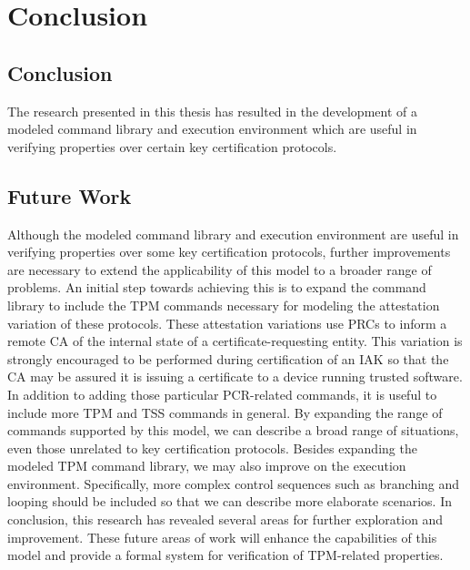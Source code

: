 \chapter{Conclusion}



\section{Conclusion}

The research presented in this thesis has resulted in the development of a modeled command library and execution environment which are useful in verifying properties over certain key certification protocols.


\section{Future Work}

Although the modeled command library and execution environment are useful in verifying properties over some key certification protocols, further improvements are necessary to extend the applicability of this model to a broader range of problems. An initial step towards achieving this is to expand the command library to include the TPM commands necessary for modeling the attestation variation of these protocols. These attestation variations use PRCs to inform a remote CA of the internal state of a certificate-requesting entity. This variation is strongly encouraged to be performed during certification of an IAK so that the CA may be assured it is issuing a certificate to a device running trusted software. In addition to adding those particular PCR-related commands, it is useful to include more TPM and TSS commands in general. By expanding the range of commands supported by this model, we can describe a broad range of situations, even those unrelated to key certification protocols.  Besides expanding the modeled TPM command library, we may also improve on the execution environment. Specifically, more complex control sequences such as branching and looping should be included so that we can describe more elaborate scenarios.  In conclusion, this research has revealed several areas for further exploration and improvement. These future areas of work will enhance the capabilities of this model and provide a formal system for verification of TPM-related properties.
